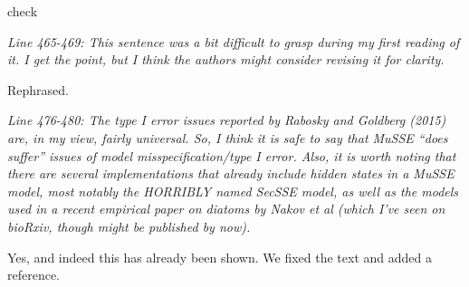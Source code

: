 \documentclass[11pt]{article}
\renewenvironment{quote}{\bigskip\noindent\itshape\ignorespaces}{\smallskip}
\begin{document}
check %


\begin{quote}
Line 465-469: This sentence was a bit difficult to grasp during my first reading of it.
I get the point, but I think the authors might consider revising it for clarity.
\end{quote}

Rephrased. %

\begin{quote}
Line 476-480: The type I error issues reported by Rabosky and Goldberg (2015) are, in my view, fairly universal.
So, I think it is safe to say that MuSSE ``does suffer'' issues of model misspecification/type I error.
Also, it is worth noting that there are several implementations that already include hidden states in a MuSSE model, most notably the HORRIBLY named SecSSE model, as well as the models used in a recent empirical paper on diatoms by Nakov et al (which I've seen on bioRxiv, though might be published by now).
\end{quote}

Yes, and indeed this has already been shown.
We fixed the text and added a reference.



\end{document}
